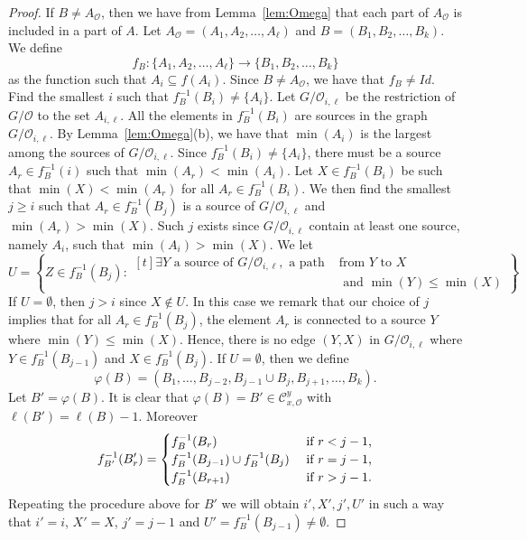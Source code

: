 \documentclass[ALCO,ThmDefs,Unicode,epreuves]{cedram}
\begin{document}
\begin{proof}
 \noindent If $B\ne A_{\mathcal{O}}$, then we have from Lemma~\ref{lem:Omega} that each part of $A_{\mathcal{O}}$ is included in a part of $A$. Let $A_{\mathcal{O}}=(A_1,A_2,\ldots,A_\ell)$ and $B=(B_1,B_2,\ldots,B_k)$. We define
 $$f_B\colon \{A_1,A_2,\ldots,A_\ell\}\to \{ B_1,B_2,\ldots,B_k\}$$
as the function such that $A_i\subseteq f(A_i)$. Since $B \ne A_{\mathcal{O}}$, we have that $f_B\ne Id$. 
Find the smallest $i$ such that $f_B^{-1}(B_i)\ne\{A_i\}$. 
Let $G/\mathcal{O}_{i,\ell}$ be the restriction of $G/\mathcal{O}$ to the set $A_{i,\ell}$.
All the elements in $f^{-1}_B(B_i)$ are sources in the graph $G/\mathcal{O}_{i,\ell}$. 
By Lemma~\ref{lem:Omega}(b), we have that $\min(A_i)$ is the largest among the sources of $G/\mathcal{O}_{i,\ell}$.
Since $f^{-1}_B(B_i)\ne\{A_i\}$, there must be a source $A_r \in f^{-1}_B(i)$ such that $\min(A_r)<\min(A_i)$. 
Let $X\in f^{-1}_B(B_i)$ be such that $\min(X)<\min(A_r)$ for all $A_r\in f^{-1}_B(B_i)$.
 We then find the smallest $j\ge i$ such that $A_r\in f^{-1}_{B}(B_j)$ is a source of $G/\mathcal{O}_{i,\ell}$ and $\min(A_r)>\min(X)$. 
 Such $j$ exists since $G/\mathcal{O}_{i,\ell}$ contain at least one source, namely $A_i$, such that $\min(A_i)>\min(X)$.
We let 
 $$U=\left\{ Z\in f^{-1}_{B}(B_j) : \begin{aligned}[t]
 \exists \text{$Y$ a source of } G/\mathcal{O}_{i,\ell},\text{ a path } &\text{from } Y \text{ to } X\\ %
 &\text{ and } \min(Y)\le \min(X)
\end{aligned} 
 \right\}.$$
If $U=\emptyset$, then $j>i$ since $X\not\in U$. 
In this case we remark that our choice of $j$ implies that for all $A_r\in f^{-1}_{B}(B_j)$, the element $A_r$ is connected to a source $Y$ where $\min(Y)\le \min(X)$.
Hence, there is no edge $(Y,X)$ in $G/\mathcal{O}_{i,\ell}$ where $Y\in f^{-1}_{B}(B_{j-1})$ and $X\in f^{-1}_{B}(B_j)$.
 If $U=\emptyset$, then we define
\begin{equation}\label{a_merge}
 \varphi(B)= (B_1,\ldots,B_{j-2},B_{j-1}\cup B_{j},B_{j+1},\ldots,B_k).
 \end{equation}
Let $B'= \varphi(B)$. It is clear that $ \varphi(B)={B}'\in \mathcal{C}_{x,\mathcal{O}}^{y}$ with $\ell({B'})=\ell({B})-1$. 
Moreover 
 $$f^{-1}_{B'}(B'_r)= \begin{cases}
 f^{-1}_{B}(B_r) &\text{ if $r<j-1$,}\cr 
 f^{-1}_{B}(B_{j-1})\cup f^{-1}_{B}(B_j)&\text{ if $r=j-1$,}\cr 
 f^{-1}_{B}(B_{r+1})&\text{ if $r>j-1$.}\cr
 \end{cases}$$
Repeating the procedure above for ${B}'$ we will obtain $i',X',j',U'$ in such a way that $i'=i$, $X'=X$, $j'=j-1$ and $U'=f^{-1}_{B}(B_{j-1})\ne\emptyset$.

\end{proof}
\end{document}
